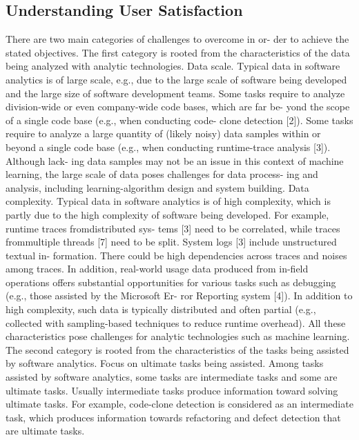 \subsection{Understanding User Satisfaction}
There are two main categories of challenges to overcome in or-
der to achieve the stated objectives. The first category is rooted from the characteristics of the data being analyzed with analytic technologies. Data scale. Typical data in software analytics is of large scale,
e.g., due to the large scale of software being developed and the large size of software development teams. Some tasks require to analyze division-wide or even company-wide code bases, which are far be- yond the scope of a single code base (e.g., when conducting code- clone detection [2]). Some tasks require to analyze a large quantity of (likely noisy) data samples within or beyond a single code base (e.g., when conducting runtime-trace analysis [3]). Although lack- ing data samples may not be an issue in this context of machine learning, the large scale of data poses challenges for data process- ing and analysis, including learning-algorithm design and system building. Data complexity. Typical data in software analytics is of high
complexity, which is partly due to the high complexity of software being developed. For example, runtime traces fromdistributed sys- tems [3] need to be correlated, while traces frommultiple threads [7] need to be split. System logs [3] include unstructured textual in- formation. There could be high dependencies across traces and noises among traces. In addition, real-world usage data produced from in-field operations offers substantial opportunities for various tasks such as debugging (e.g., those assisted by the Microsoft Er- ror Reporting system [4]). In addition to high complexity, such data is typically distributed and often partial (e.g., collected with sampling-based techniques to reduce runtime overhead). All these characteristics pose challenges for analytic technologies such as machine learning. The second category is rooted from the characteristics of the
tasks being assisted by software analytics. Focus on ultimate tasks being assisted. Among tasks assisted
by software analytics, some tasks are intermediate tasks and some are ultimate tasks. Usually intermediate tasks produce information toward solving ultimate tasks. For example, code-clone detection is considered as an intermediate task, which produces information towards refactoring and defect detection that are ultimate tasks.


